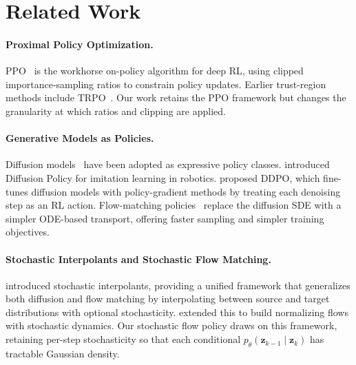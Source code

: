 \section{Related Work}
\label{sec:related}

\paragraph{Proximal Policy Optimization.}
PPO~\citep{schulman2017ppo} is the workhorse on-policy algorithm for deep RL,
using clipped importance-sampling ratios to constrain policy updates.  Earlier
trust-region methods include TRPO~\citep{schulman2015trpo}.  Our work retains
the PPO framework but changes the granularity at which ratios and clipping are
applied.

\paragraph{Generative Models as Policies.}
Diffusion models~\citep{ho2020ddpm,song2021scorebased} have been adopted as
expressive policy classes.  \citet{chi2023diffusion} introduced Diffusion
Policy for imitation learning in robotics.  \citet{black2024ddpo} proposed DDPO,
which fine-tunes diffusion models with policy-gradient methods by treating each
denoising step as an RL action.  Flow-matching
policies~\citep{lipman2023flow,liu2023flow} replace the diffusion SDE with a
simpler ODE-based transport, offering faster sampling and simpler training
objectives.

\paragraph{Stochastic Interpolants and Stochastic Flow Matching.}
\citet{albergo2023stochastic} introduced stochastic interpolants, providing a
unified framework that generalizes both diffusion and flow matching by
interpolating between source and target distributions with optional stochasticity.
\citet{albergo2023building} extended this to build normalizing flows with
stochastic dynamics.  Our stochastic flow policy draws on this framework,
retaining per-step stochasticity so that each conditional
$p_\theta(\mathbf{z}_{k-1}\mid\mathbf{z}_k)$ has tractable Gaussian density.

